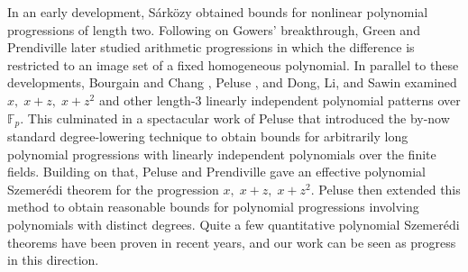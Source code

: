 \documentclass[11pt]{amsart}
\theoremstyle{definition}
\newcommand{\F}{{\mathbb F}}
\begin{document}
In an early development, S\'ark\"ozy \cite{Sa78a, Sa78b} obtained bounds for nonlinear polynomial progressions of length two. {Following on Gowers' breakthrough, Green \cite{Gr02} and Prendiville \cite{Pre17} later studied arithmetic progressions in which the difference is restricted to an image set of a fixed homogeneous polynomial.
In parallel to these developments, Bourgain and Chang \cite{BC17}, Peluse \cite{Pel18}, and Dong, Li, and Sawin \cite{DLS17} examined $x,\; x + z,\; x + z^2$ and other length-3 linearly independent polynomial patterns over $\F_p$. This culminated in a spectacular work of Peluse \cite{Pel19} that introduced the by-now standard degree-lowering technique to obtain bounds for arbitrarily long polynomial progressions with linearly independent polynomials over the finite fields.}  Building on that, Peluse and Prendiville \cite{PP19} gave an effective polynomial Szemer\'edi theorem for the progression $x,\; x + z,\; x + z^2$. Peluse \cite{Pel19} then extended this method to obtain reasonable bounds for polynomial progressions involving polynomials with distinct degrees. Quite a few quantitative polynomial Szemer\'edi theorems \cite{BB23, HLY21, Kuc21a, Kuc23, Kuc22b, Leng23a, Leng22, PSS23, SW25} have been proven in recent years, and our work \cite{KKL24b} can be seen as progress in this direction. 
\end{document}
